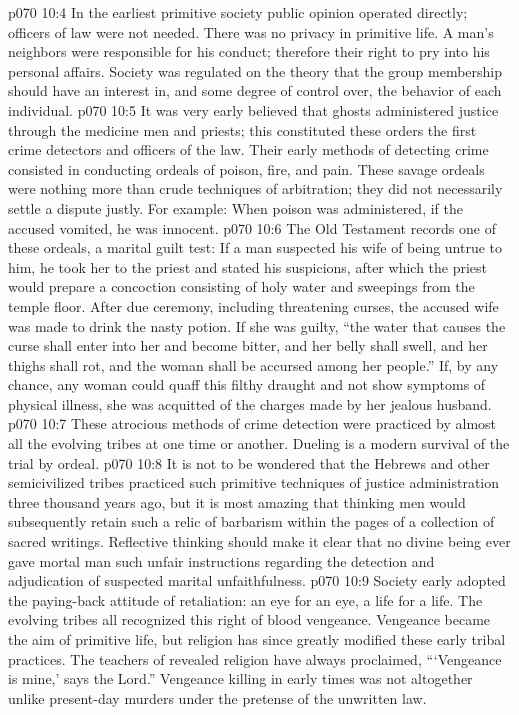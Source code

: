 \vs p070 10:4 \pc In the earliest primitive society public opinion operated directly; officers of law were not needed. There was no privacy in primitive life. A man’s neighbors were responsible for his conduct; therefore their right to pry into his personal affairs. Society was regulated on the theory that the group membership should have an interest in, and some degree of control over, the behavior of each individual.
\vs p070 10:5 It was very early believed that ghosts administered justice through the medicine men and priests; this constituted these orders the first crime detectors and officers of the law. Their early methods of detecting crime consisted in conducting ordeals of poison, fire, and pain. These savage ordeals were nothing more than crude techniques of arbitration; they did not necessarily settle a dispute justly. For example: When poison was administered, if the accused vomited, he was innocent.
\vs p070 10:6 The Old Testament records one of these ordeals, a marital guilt test: If a man suspected his wife of being untrue to him, he took her to the priest and stated his suspicions, after which the priest would prepare a concoction consisting of holy water and sweepings from the temple floor. After due ceremony, including threatening curses, the accused wife was made to drink the nasty potion. If she was guilty, “the water that causes the curse shall enter into her and become bitter, and her belly shall swell, and her thighs shall rot, and the woman shall be accursed among her people.” If, by any chance, any woman could quaff this filthy draught and not show symptoms of physical illness, she was acquitted of the charges made by her jealous husband.
\vs p070 10:7 These atrocious methods of crime detection were practiced by almost all the evolving tribes at one time or another. Dueling is a modern survival of the trial by ordeal.
\vs p070 10:8 It is not to be wondered that the Hebrews and other semicivilized tribes practiced such primitive techniques of justice administration three thousand years ago, but it is most amazing that thinking men would subsequently retain such a relic of barbarism within the pages of a collection of sacred writings. Reflective thinking should make it clear that no divine being ever gave mortal man such unfair instructions regarding the detection and adjudication of suspected marital unfaithfulness.
\vs p070 10:9 \pc Society early adopted the paying\hyp{}back attitude of retaliation: an eye for an eye, a life for a life. The evolving tribes all recognized this right of blood vengeance. Vengeance became the aim of primitive life, but religion has since greatly modified these early tribal practices. The teachers of revealed religion have always proclaimed, “‘Vengeance is mine,’ says the Lord.” Vengeance killing in early times was not altogether unlike present\hyp{}day murders under the pretense of the unwritten law.
